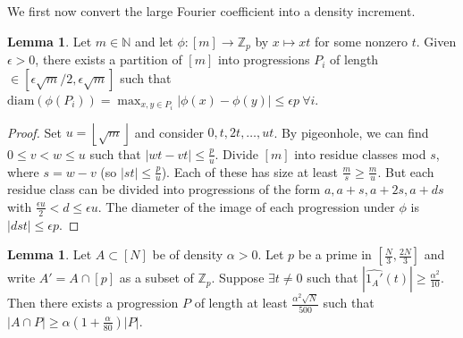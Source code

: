 \documentclass{article}
\theoremstyle{definition}
\newtheorem{lemma}[theorem]{Lemma}
\begin{document}
We first now convert the large Fourier coefficient into a density increment.
\begin{lemma}\label{lemma1.22}
    Let $m \in \mathbb{N}$ and let $\phi: [m] \to \mathbb{Z}_p$  by $x \mapsto xt$ for some nonzero $t$. Given $\epsilon>0$, there exists a partition of $[m]$ into progressions $P_i$ of length $\in \left[\epsilon \sqrt{m}/2, \epsilon \sqrt{m}\right]$ such that $\text{diam}(\phi(P_i)) = \max_{x,y \in P_i} \left|\phi(x)-\phi(y)\right|\le \epsilon p ~\forall i$. 
\end{lemma}
\begin{proof}
    Set $u = \left\lfloor \sqrt{m} \right\rfloor$ and consider $0,t,2t,\ldots,ut$. By pigeonhole, we can find $0\le v<w\le u$ such that $\left|wt - vt \right| \le \frac{p}{u}$. Divide $[m]$ into residue classes mod $s$, where $s = w-v$ (so $\left|st \right|\le \frac{p}{u}$). Each of these has size at least $\frac{m}{s}\ge \frac{m}{u}$. But each residue class can be divided into progressions of the form $a, a+s, a+2s, a+ds$ with $\frac{\epsilon u }{2} < d \le \epsilon u$. The diameter of the image of each progression under $\phi$ is $\left|dst \right| \le \epsilon p$. 
\end{proof}
\begin{lemma}
    Let $A \subset [N]$ be of density $\alpha>0$. Let $p$ be a prime in $\left[\frac{N}{3}, \frac{2N}{3}\right]$ and write $A' = A \cap [p]$ as a subset of $\mathbb{Z}_p$. Suppose $\exists t\neq 0$ such that $\left|\widehat{1_A'}(t)\right|\ge \frac{\alpha^2}{10}$. Then there exists a progression $P$ of length at least $\frac{\alpha^2\sqrt{N}}{500}$ such that $\left|A \cap P\right| \ge \alpha \left(1+\frac{\alpha}{80}\right)\left|P\right|$.
\end{lemma}
\end{document}
